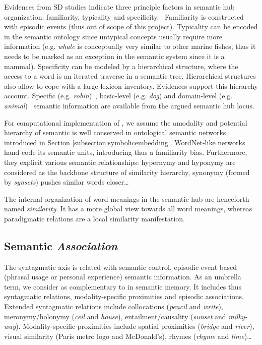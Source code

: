 Evidences from SD studies indicate three principle factors in semantic hub organization: familiarity, typicality and specificity.~\parencite{pattersonWhereYouKnow2007} Familiarity is constructed with episodic events (thus out of scope of this project). Typicality can be encoded in the semantic ontology since untypical concepts usually require more information (e.g. \emph{whale} is conceptually very similar to other marine fishes, thus it needs to be marked as an exception in the semantic system since it is a mammal). Specificity can be modeled by a hierarchical structure, where the access to a word is an iterated traverse in a semantic tree. Hierarchical structures also allow to cope with a large lexicon inventory. Evidences support this hierarchy account. Specific (e.g. \emph{robin})~\parencite{rogersAnteriorTemporalCortex2006}, basic-level (e.g. \emph{dog}) and domain-level (e.g. \emph{animal})~\parencite{pobricCategorySpecificCategoryGeneralSemantic2010} semantic information are available from the argued semantic hub locus. 

For computational implementation of \similarity, we assume the amodality and potential hierarchy of semantic \similarity is well conserved in ontological semantic networks introduced in Section \ref{subsection:symbolicembedding}. WordNet-like networks hand-code its semantic units, introducing thus a familiarity bias. Furthermore, they explicit various semantic relationships: hypernymy and hyponymy are considered as the backbone structure of similarity hierarchy, synonymy (formed by \emph{synsets}) pushes similar words closer\dots

The internal organization of word-meanings in the semantic hub are henceforth named \emph{similarity}. It has a more global view towards all word meanings, whereas paradigmatic relations are a local similarity manifestation. 

\subsection{Semantic \emph{Association}}

The syntagmatic axis is related with semantic control, episodic-event based (phrasal usage or personal experience) semantic information. As an umbrella term, we consider \association as complementary to \similarity in semantic memory. It includes thus syntagmatic relations, modality-specific proximities and episodic associations. Extended syntagmatic relations include collocations (\emph{pencil} and \emph{write}), meronymy\slash holonymy (\emph{ceil} and \emph{house}), entailment\slash causality (\emph{sunset} and \emph{milky-way}). Modality-specific proximities include spatial proximities (\emph{bridge} and \emph{river}), visual similarity (Paris metro logo and McDonald's), rhymes (\emph{rhyme} and \emph{lime})\dots

